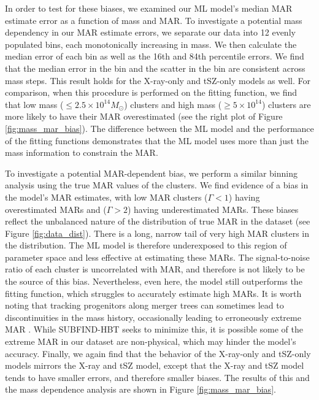In order to test for these biases, we examined our ML model's median MAR estimate error as a function of mass and MAR. To investigate a potential mass dependency in our MAR estimate errors, we separate our data into 12 evenly populated bins, each monotonically increasing in mass. We then calculate the median error of each bin as well as the 16th and 84th percentile errors. We find that the median error in the bin and the scatter in the bin are consistent across mass steps. This result holds for the X-ray-only and tSZ-only models as well. For comparison, when this procedure is performed on the fitting function, we find that low mass ($\leq2.5\times 10^{14} M_{\odot}$) clusters and high mass ($\geq 5\times10^{14}$) clusters are more likely to have their MAR overestimated (see the right plot of Figure \ref{fig:mass_mar_bias}). The difference between the ML model and the performance of the fitting functions demonstrates that the ML model uses more than just the mass information to constrain the MAR.

To investigate a potential MAR-dependent bias, we perform a similar binning analysis using the true MAR values of the clusters. We find evidence of a bias in the model's MAR estimates, with low MAR clusters ($\Gamma<1$) having overestimated MARs and ($\Gamma>2$) having underestimated MARs. These biases reflect the unbalanced nature of the distribution of true MAR in the dataset (see Figure \ref{fig:data_dist}). There is a long, narrow tail of very high MAR clusters in the distribution. The ML model is therefore underexposed to this region of parameter space and less effective at estimating these MARs. The signal-to-noise ratio of each cluster is uncorrelated with MAR, and therefore is not likely to be the source of this bias. Nevertheless, even here, the model still outperforms the fitting function, which struggles to accurately estimate high MARs. It is worth noting that tracking progenitors along merger trees can sometimes lead to discontinuities in the mass history, occasionally leading to erroneously extreme MAR \cite[][see discussion in section 6]{halo_finder_comp}. While SUBFIND-HBT seeks to minimize this, it is possible some of the extreme MAR in our dataset are non-physical, which may hinder the model's accuracy. Finally, we again find that the behavior of the X-ray-only and tSZ-only models mirrors the X-ray and tSZ model, except that the X-ray and tSZ model tends to have smaller errors, and therefore smaller biases. The results of this and the mass dependence analysis are shown in Figure \ref{fig:mass_mar_bias}.

